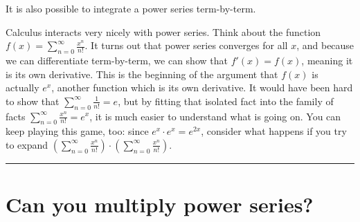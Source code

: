 \documentclass{ximera}
\begin{document}
It is also possible to integrate a power series term-by-term.


Calculus interacts very nicely with power series.  Think about the function \(f(x) = \sum_{n=0}^\infty \frac{x^n}{n!}\).  It turns out that power series converges for all \(x\), and because we can differentiate term-by-term, we can show that \(f'(x) = f(x)\), meaning it is its own derivative.  This is the beginning of the argument that \(f(x)\) is actually \(e^x\), another function which is its own derivative.  It would have been hard to show that \(\sum_{n=0}^\infty \frac{1}{n!} = e\), but by fitting that isolated fact into the family of facts \(\sum_{n=0}^\infty \frac{x^n}{n!} = e^x\), it is much easier to understand what is going on.  You can keep playing this game, too: since \(e^x \cdot e^x = e^{2x}\), consider what happens if you try to expand \(\left(\sum_{n=0}^\infty \frac{x^n}{n!}\right) \cdot \left(\sum_{n=0}^\infty \frac{x^n}{n!}\right)\).  


\hrule

\section{Can you multiply power series?}

\end{document}
